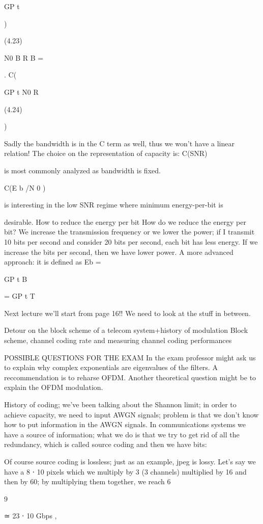 {{{{{GP t

)

(4.23)

N0 B R B =

.
C(

GP t N0 R

(4.24)

)

Sadly the bandwidth is in the C term as well, thus we won't have a linear relation!
The choice on the representation of capacity is:
C(SNR)

is most commonly analyzed as bandwidth is fixed.

C(E b /N 0 )

is interesting in the low SNR regime where minimum energy-per-bit is

desirable.
How to reduce the energy per bit How do we reduce the energy per bit? We increase the transmission frequency or we lower the power; if I transmit 10 bits per second and consider 20 bits per second,
each bit has less energy. If we increase the bits per second, then we have lower power.
A more advanced approach: it is defined as Eb =

GP t B

= GP t T

Next lecture we'll start from page 16!! We need to look at the stuff in between.

Detour on the block scheme of a telecom system+history of modulation Block scheme, channel coding rate and measuring channel coding performances

POSSIBLE QUESTIONS FOR THE EXAM In the exam professor might ask us to explain why complex exponentials are eigenvalues of the filters.
A reccommendation is to reharse OFDM.
Another theoretical question might be to explain the OFDM modulation.

History of coding; we've been talking about the Shannon limit; in order to achieve capacity, we need to input AWGN signals; problem is that we don't know how to put information in the AWGN signals.
In communications systems we have a source of information; what we do is that we try to get rid of all the redundancy, which is called source coding and then we have bits:

Of course source coding is lossless; just as an example, jpeg is lossy.
Let's say we have a 8 ⋅ 10 pixels which we multiply by 3 (3 channels) multiplied by 16 and then by 60; by multiplying them together, we reach 6

9

≃ 23 ⋅ 10 Gbps ,

}}}}}
